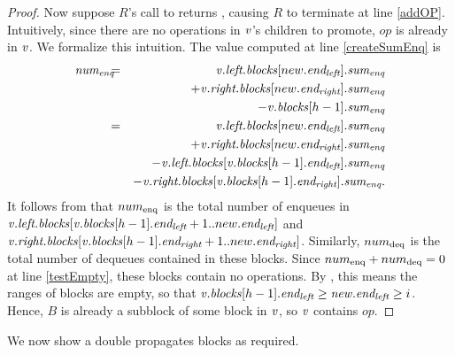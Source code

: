 \begin{proof}
Now suppose $R$'s call to  returns \nl, causing $R$ to terminate at line \ref{addOP}.
Intuitively, since there are no operations in $\mbox{\textnormal{\textit{v}}}$'s children to promote, $op$ is already in $\mbox{\textnormal{\textit{v}}}$.
We formalize this intuition.
The value computed at line \ref{createSumEnq} is
\begin{eqnarray*}
\var{num\sub{enq}} \hspace*{-2mm}
&=& \hspace*{-2mm} \var{v}.\fld{left.blocks}[new.\eleft].\fld{sum\sub{enq}} \\
&& + \var{v}.\fld{right.blocks}[new.\eright].\fld{sum\sub{enq}}\\
&&  - \var{v}.\fld{blocks}[h-1].\fld{sum\sub{enq}} \\
&=& \hspace*{-2mm}\var{v}.\fld{left.blocks}[new.\eleft].\fld{sum\sub{enq}}\\
&& + \var{v}.\fld{right.blocks}[new.\eright].\fld{sum\sub{enq}} \\
&&- \var{v}.\fld{left.blocks}[\var{v}.\fld{blocks}[h-1].\eleft].\fld{sum\sub{enq}} \\
&& - \var{v}.\fld{right.blocks}[\var{v}.\fld{blocks}[h-1].\eright].\fld{sum\sub{enq}}.
\end{eqnarray*}
It follows from  that $num\textsubscript{enq}$ is the total  number of enqueues  in 
$\mbox{\textnormal{\textit{v}}}.\mbox{\textit{left.blocks}}[\mbox{\textnormal{\textit{v}}}.\mbox{\textit{blocks}}[h-1].\mbox{\textit{end\textsubscript{left}}}+1..new.\mbox{\textit{end\textsubscript{left}}}]$ and
$\mbox{\textnormal{\textit{v}}}.\mbox{\textit{right.blocks}}[\mbox{\textnormal{\textit{v}}}.\mbox{\textit{blocks}}[h-1].\mbox{\textit{end\textsubscript{right}}}+1..new.\mbox{\textit{end\textsubscript{right}}}]$.
Similarly, $num\textsubscript{deq}$ is the total number of dequeues contained in these blocks.
Since $num\textsubscript{enq}+num\textsubscript{deq}=0$ at line \ref{testEmpty},
these blocks contain no operations.
By , this means the ranges of blocks are empty, so that $\mbox{\textnormal{\textit{v}}}.\mbox{\textit{blocks}}[h-1].\mbox{\textit{end\textsubscript{left}}} \geq \mbox{\textnormal{\textit{new}}}.\mbox{\textit{end\textsubscript{left}}} \geq i$.
Hence, $B$ is already a subblock of some block in $\mbox{\textnormal{\textit{v}}}$, so $\mbox{\textnormal{\textit{v}}}$ contains $op$.
\end{proof}

We now show  a double  propagates blocks as required.

